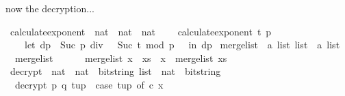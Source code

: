 \begin{isabellebody}
\begin{isamarkuptext}
now the decryption...%
\end{isamarkuptext}\isamarkuptrue%
\isamarkupfalse%
\ calculate{\isacharunderscore}{\kern0pt}exponent\ {\isacharcolon}{\kern0pt}{\isacharcolon}{\kern0pt}\ {\isachardoublequoteopen}nat\ {\isasymRightarrow}\ nat\ {\isasymRightarrow}\ nat{\isachardoublequoteclose}\ \ \isanewline
\ \ {\isachardoublequoteopen}calculate{\isacharunderscore}{\kern0pt}exponent\ t\ p\ {\isacharequal}{\kern0pt}\ \isanewline
\ \ \ \ {\isacharparenleft}{\kern0pt}let\ d{\isacharunderscore}{\kern0pt}p\ {\isacharequal}{\kern0pt}\ {\isacharparenleft}{\kern0pt}{\isacharparenleft}{\kern0pt}Suc\ p{\isacharparenright}{\kern0pt}\ div\ {}{\isacharparenright}{\kern0pt}\ {\isacharcircum}{\kern0pt}\ {\isacharparenleft}{\kern0pt}Suc\ t{\isacharparenright}{\kern0pt}\ mod\ {\isacharparenleft}{\kern0pt}p\ {\isacharminus}{\kern0pt}\ {}{\isacharparenright}{\kern0pt}\ in\ d{\isacharunderscore}{\kern0pt}p{\isacharparenright}{\kern0pt}{\isachardoublequoteclose}\isanewline
\isanewline
{}\isamarkupfalse%
\ merge{\isacharunderscore}{\kern0pt}list\ {\isacharcolon}{\kern0pt}{\isacharcolon}{\kern0pt}\ {\isachardoublequoteopen}{\isacharprime}{\kern0pt}a\ list\ list\ {\isacharequal}{\kern0pt}{\isachargreater}{\kern0pt}\ {\isacharprime}{\kern0pt}a\ list{\isachardoublequoteclose}\ \isanewline
\ \ {\isachardoublequoteopen}merge{\isacharunderscore}{\kern0pt}list\ {\isacharbrackleft}{\kern0pt}{\isacharbrackright}{\kern0pt}\ {\isacharequal}{\kern0pt}\ {\isacharbrackleft}{\kern0pt}{\isacharbrackright}{\kern0pt}{\isachardoublequoteclose}\ {\isacharbar}{\kern0pt}\isanewline
\ \ {\isachardoublequoteopen}merge{\isacharunderscore}{\kern0pt}list\ {\isacharparenleft}{\kern0pt}x\ {\isacharhash}{\kern0pt}\ xs{\isacharparenright}{\kern0pt}\ {\isacharequal}{\kern0pt}\ x\ {\isacharat}{\kern0pt}\ {\isacharparenleft}{\kern0pt}merge{\isacharunderscore}{\kern0pt}list\ xs{\isacharparenright}{\kern0pt}{\isachardoublequoteclose}\isanewline
\isanewline
{}\isamarkupfalse%
\ decrypt\ {\isacharcolon}{\kern0pt}{\isacharcolon}{\kern0pt}\ {\isachardoublequoteopen}nat\ {\isasymRightarrow}\ nat\ {\isasymRightarrow}\ {\isacharparenleft}{\kern0pt}bitstring\ list\ {\isasymtimes}\ nat{\isacharparenright}{\kern0pt}\ {\isasymRightarrow}\ bitstring{\isachardoublequoteclose}\ \isanewline
\ \ {\isachardoublequoteopen}decrypt\ p\ q\ tup\ {\isacharequal}{\kern0pt}\ {\isacharparenleft}{\kern0pt}case\ tup\ of\ {\isacharparenleft}{\kern0pt}c{\isacharcomma}{\kern0pt}\ x{\isacharparenright}{\kern0pt}\ {\isasymRightarrow}\ \isanewline

\end{isabellebody}
